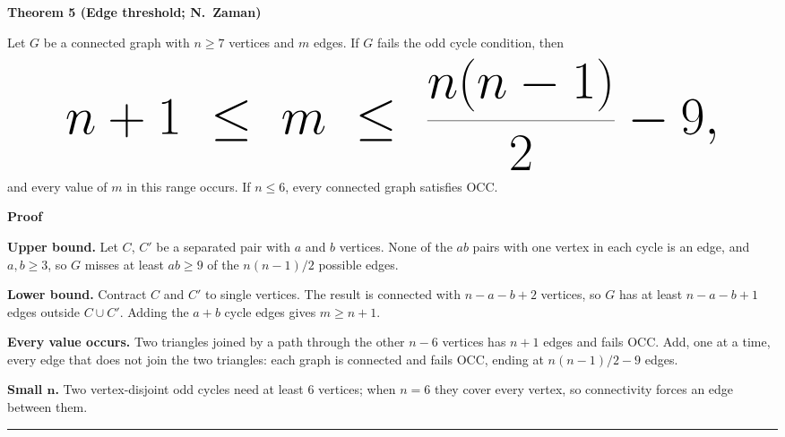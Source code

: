 \documentclass{article}
\newcommand{\labelsize}{\fontsize{34}{41}\selectfont}
\newcommand{\citesize}{\fontsize{28}{34}\selectfont}
\newlength{\colwidth}
\newlength{\colheight}
\newcommand{\sect}[1]{%
  {\sffamily\bfseries\fontsize{50}{58}\selectfont\color{navy}#1\par}%
  \vspace{4pt}{\color{navy}\hrule height 3pt}\vspace{14pt}}
\newcommand{\boxlabel}[2]{%
  {\sffamily\bfseries\labelsize\color{navy}#1%
  \if\relax\detokenize{#2}\relax\else\ {\mdseries\citesize\color{subtext}#2}\fi\par}\vspace{6pt}}
\newcommand{\qedbox}{\rule{0.6em}{0.6em}}
\begin{document}
\hfill
\begin{minipage}[t][\colheight][s]{\colwidth}\vspace{0pt}%
\begin{mainthm}
\boxlabel{Theorem 5 (Edge threshold; N.~Zaman)}{}
Let $G$ be a connected graph with $n\ge 7$ vertices and $m$ edges. If $G$ fails the odd cycle
condition, then
\[
  \mbox{\fontsize{42}{50}\selectfont$n+1 \;\le\; m \;\le\; \dfrac{n(n-1)}{2}-9,$}
\]
and every value of $m$ in this range occurs. If $n\le 6$, every connected graph satisfies OCC.
\end{mainthm}

\vfill
\sect{Proof}
\textbf{Upper bound.} Let $C$, $C'$ be a separated pair with $a$ and $b$ vertices. None of the
$ab$ pairs with one vertex in each cycle is an edge, and $a,b\ge 3$, so $G$ misses at least
$ab\ge 9$ of the $n(n-1)/2$ possible edges.

\textbf{Lower bound.} Contract $C$ and $C'$ to single vertices. The result is connected with
$n-a-b+2$ vertices, so $G$ has at least $n-a-b+1$ edges outside $C\cup C'$. Adding the $a+b$
cycle edges gives $m\ge n+1$.

\textbf{Every value occurs.} Two triangles joined by a path through the other $n-6$ vertices has
$n+1$ edges and fails OCC. Add, one at a time, every edge that does not join the two triangles:
each graph is connected and fails OCC, ending at $n(n-1)/2-9$ edges.

\textbf{Small $\boldsymbol{n}$.} Two vertex-disjoint odd cycles need at least 6 vertices; when
$n=6$ they cover every vertex, so connectivity forces an edge between them. \hfill\qedbox


\end{minipage}
\end{document}
